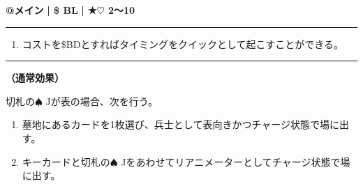 \documentclass[twocolumn,a5paper,papersize,10pt]{jarticle}
\begin{document}
\begin{tcolorbox}[title={\small\bf【Action】リアニメーター召喚}{\scriptsize （召喚）}]

{\scriptsize\bf @メイン }
  {\scriptsize\bf | \$ BL }
  {\scriptsize\bf | ★{\normalsize $\heartsuit$} 2〜10}

\vspace{1mm} %
\hrule height 0.1mm depth 0mm width 62mm %
\vspace{1mm} %


\vspace{-1zh}%
\begin{enumerate}
\renewcommand{\labelenumi}{※}
\setlength{\leftskip}{-0.3cm}
\setlength{\itemsep}{0pt} %
\setlength{\parskip}{0pt} %

\item コストを\$BDとすればタイミングをクイックとして起こすことができる。

\vspace{-3mm}%
\end{enumerate}
\vspace{-2mm} %
\vspace{1zh}%
\vspace{1mm} %
\hrule height 0.1mm depth 0mm width 62mm %
\vspace{1mm} %

{\bf（通常効果）}

切札の{\normalsize $\spadesuit$} Jが表の場合、次を行う。


\vspace{-1zh}%
\begin{enumerate}
\setlength{\leftskip}{-0.3cm}
\setlength{\parskip}{0pt} %

\item 墓地にあるカードを1枚選び、兵士として表向きかつチャージ状態で場に出す。

\item キーカードと切札の{\normalsize $\spadesuit$} Jをあわせてリアニメーターとしてチャージ状態で場に出す。
\vspace{-1zh}%
\end{enumerate}

\vspace{1mm} %
\end{tcolorbox}

\vspace{-1zh}
\end{document}
